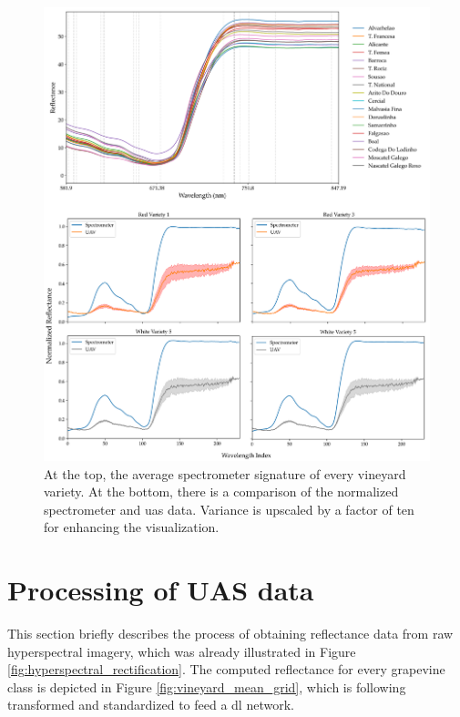 \begin{figure}[ht]
    \centering
    \includegraphics[width=\linewidth]{figs/vineyard_classification/spectrometer_varieties.png}
	\caption{At the top, the average spectrometer signature of every vineyard variety. At the bottom, there is a comparison of the normalized spectrometer and \acrshort{uas} data. Variance is upscaled by a factor of ten for enhancing the visualization.}
	\label{fig:spectrometer_uav_data}
\end{figure}

\section{Processing of UAS data}
\label{sec:vineyard_hyperspectral_processing}

This section briefly describes the process of obtaining reflectance data from raw hyperspectral imagery, which was already illustrated in Figure \ref{fig:hyperspectral_rectification}. The computed reflectance for every grapevine class is depicted in Figure \ref{fig:vineyard_mean_grid}, which is following transformed and standardized to feed a \acrshort{dl} network. 

